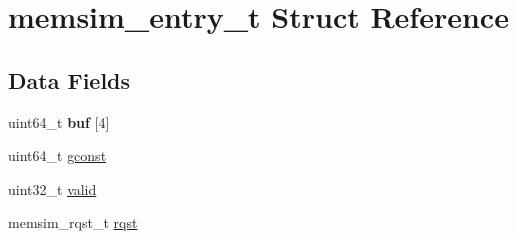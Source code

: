 \hypertarget{structmemsim__entry__t}{\section{memsim\-\_\-entry\-\_\-t Struct Reference}
\label{structmemsim__entry__t}
}
\subsection*{Data Fields}
\begin{DoxyCompactItemize}
\item 
\hypertarget{structmemsim__entry__t_ac8a6d8074d88a12a21d8b9b1b7a71dc9}{uint64\-\_\-t {\bfseries buf} \mbox{[}4\mbox{]}}\label{structmemsim__entry__t_ac8a6d8074d88a12a21d8b9b1b7a71dc9}

\item 
uint64\-\_\-t \hyperlink{structmemsim__entry__t_a5e6fc38a3aa83e0c1ec7fcf9e1cf2563}{gconst}
\item 
uint32\-\_\-t \hyperlink{structmemsim__entry__t_a0c0fd08ced6d9c59b1c2806186ac6dc2}{valid}
\item 
memsim\-\_\-rqst\-\_\-t \hyperlink{structmemsim__entry__t_a0bd6994a034a78c0d2b8d2adfc0cf2bd}{rqst}
\end{DoxyCompactItemize}


